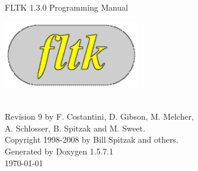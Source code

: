 \documentclass[a4paper]{book}
\begin{document}
\begin{titlepage}
\vspace*{4.5cm}
\begin{center}
{\Huge FLTK 1.3.0 Programming Manual}\\
\vspace*{2cm}
\begin{ImageNoCaption}
 \mbox{\includegraphics[width=6cm]{FL200}}
\end{ImageNoCaption}\\
\vspace*{2cm}
{\Large
Revision 9 by F. Costantini, D. Gibson, M. Melcher, \\
A. Schlosser, B. Spitzak and M. Sweet.}\\
\vspace*{1.5cm}
{\large Copyright 1998-2008 by Bill Spitzak and others.}\\
\vspace*{3.5cm}
{\large Generated by Doxygen 1.5.7.1}\\
\vspace*{0.5cm}
\today{}\\
\end{center}
\end{titlepage}
\clearemptydoublepage
{}
\tableofcontents
\clearemptydoublepage
{}
\end{document}
